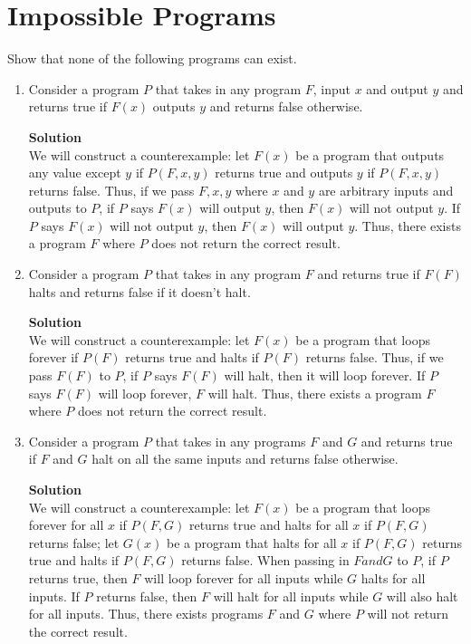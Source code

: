 \documentclass[11pt]{article}
\newcommand*{\Question}[1]{\section{#1}}
\newenvironment{Parts}{\begin{enumerate}[label=(\alph*)]}{\end{enumerate}}
\newcommand*{\Part}{\item}
\newenvironment{Answer}{\vspace{10pt}\begin{mdframed}\textbf{Solution}\\}{\end{mdframed}\vfill\pagebreak[3]}
\newenvironment{Answer}{\vspace{10pt}}{\vfill\pagebreak[3]}
\begin{document}
\begin{Parts}
\end{Parts}

\Question{Impossible Programs}

Show that none of the following programs can exist.

\begin{Parts}

\Part
Consider a program $P$ that takes in any program $F$, input $x$ and output $y$ and returns true if
$F(x)$ outputs $y$ and returns false otherwise.
\begin{Answer}
     We will construct a counterexample: let $F(x)$ be a program that outputs any value except $y$ if $P(F,x,y)$ returns true and outputs $y$ if $P(F,x,y)$ returns false. Thus, if we pass $F,x,y$ where $x$ and $y$ are arbitrary inputs and outputs to $P$, if $P$ says $F(x)$ will output $y$, then $F(x)$ will not output $y$. If $P$ says $F(x)$ will not output $y$, then $F(x)$ will output $y$. Thus, there exists a program $F$ where $P$ does not return the correct result.   
\end{Answer}

\Part
Consider a program $P$ that takes in any program $F$ and returns true if $F(F)$ halts and returns
false if it doesn't halt.
\begin{Answer}
    We will construct a counterexample: let $F(x)$ be a program that loops forever if $P(F)$ returns true and halts if $P(F)$ returns false. Thus, if we pass $F(F)$ to $P$, if $P$ says $F(F)$ will halt, then it will loop forever. If $P$ says $F(F)$ will loop forever, $F$ will halt. Thus, there exists a program $F$ where $P$ does not return the correct result.
\end{Answer}

\Part
Consider a program $P$ that takes in any programs $F$ and $G$ and returns true if $F$ and $G$ halt
on all the same inputs and returns false otherwise.
\begin{Answer}
     We will construct a counterexample: let $F(x)$ be a program that loops forever for all $x$ if $P(F,G)$ returns true and halts for all $x$ if $P(F,G)$ returns false; let $G(x)$ be a program that halts for all $x$ if $P(F,G)$ returns true and halts if $P(F,G)$ returns false. When passing in $F and G$ to $P$, if $P$ returns true, then $F$ will loop forever for all inputs while $G$ halts for all inputs. If $P$ returns false, then $F$ will halt for all inputs while $G$ will also halt for all inputs. Thus, there exists programs $F$ and $G$ where $P$ will not return the correct result.
\end{Answer}
\end{Parts}
\end{document}
